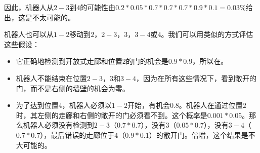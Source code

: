 


因此，机器人从$2-3$到$4$的可能性由$0.2*0.05*0.7*0.7*0.7*0.9*0.1=0.03\%$给出，这是不太可能的。


机器人也可以从$1-2$移动到$2$，$2-3$，$3$，$3-4$或$4$。我们可以用类似的方式评估这些假设：

\begin{itemize}

\item 它正确地检测到开放式走廊和位置$2$的门的机会是$0.9*0.9$，所以在。
\item 机器人不能结束在位置$2-3$，$3$和$3-4$，因为在所有这些情况下，看到敞开的门，而不是右侧的墙壁的机会为零。
\item 为了达到位置$4$，机器人必须以$1-2$开始，有机会$0.8$。机器人在通过位置$2$时，其左侧的走廊和右侧的敞开的门必须看不到。这个概率是$0.001*0.05$。那么机器人必须没有检测到$2-3$（$0.7*0.7$），没有$3$（$0.05*0.7$），没有$3-4$（$0.7*0.7$），最后错误的走廊位于$4$（$0.9*0.1$）的敞开门。倍增，这个结果是不大可能的。
\end{itemize}


